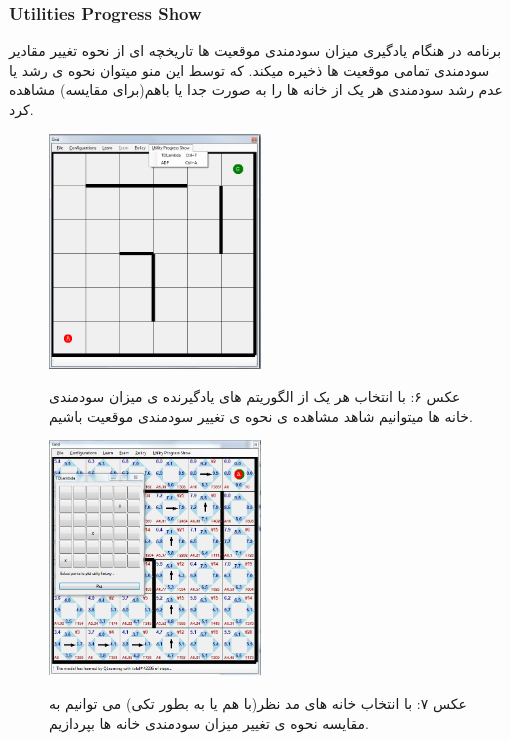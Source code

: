 \documentclass[10pt,a4paper]{article}
\begin{document}
\begin{Arabic}
    \subsubsection{Utilities Progress Show}
    برنامه در هنگام یادگیری میزان سودمندی موقعیت ها تاریخچه ای از نحوه تغییر مقادیر سودمندی تمامی موقعیت ها ذخیره میکند. که توسط این منو میتوان نحوه ی رشد یا عدم رشد سودمندی هر یک از خانه ها را به صورت جدا یا باهم(برای مقایسه) مشاهده کرد.
\begin{figure}[H]
    \centering
    \includegraphics[width=0.5\textwidth]{util-menu}
    \begin{center}
    \textarabic{عکس ۶: با انتخاب هر یک از الگوریتم های یادگیرنده ی میزان سودمندی خانه ها میتوانیم شاهد مشاهده ی نحوه ی تغییر سودمندی موقعیت باشیم.}
    \end{center}
\end{figure}\begin{figure}[H]
    \centering
    \includegraphics[width=0.5\textwidth]{util-form}
    \begin{center}
    \textarabic{عکس ۷: با انتخاب خانه های مد نظر(با هم یا به بطور تکی) می توانیم به مقایسه نحوه ی تغییر میزان سودمندی خانه ها بپردازیم.}
    \end{center}
\end{figure}

\end{Arabic}
\end{document}
